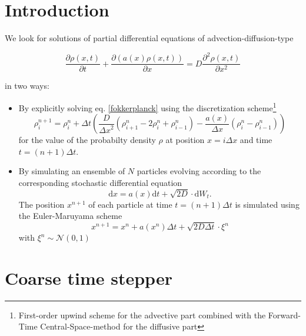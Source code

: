 \documentclass[]{article}
\title{}
\author{}
\newcommand{\pa}[2]{\frac{\partial #1}{\partial #2}}
\newcommand{\ppa}[2]{\frac{\partial^2 #1}{\partial #2^2}}
\newcommand{\dd}{\ensuremath{\mathrm{d}}}
\begin{document}
\maketitle

\begin{abstract}

\end{abstract}

\section{Introduction}

We look for solutions of partial differential equations of advection-diffusion-type

\begin{equation}
\label{fokkerplanck}
\pa{\rho(x,t)}{t} + \pa{(a(x) \rho(x,t))}{x} = D  \ppa{\rho(x,t)}{x} 
\end{equation}

in two ways:
\begin{itemize}
\item By explicitly solving eq. \eqref{fokkerplanck} using the discretization scheme\footnote{First-order upwind scheme for the advective part combined with the Forward-Time Central-Space-method for the diffusive part}
\begin{equation} 
\label{pde_discretization}
\rho_i^{n+1} = \rho_i^n + \Delta t \left( \frac{D}{{\Delta x}^2} \left( \rho_{i+1}^{n} - 2 \rho_i^n + \rho_{i-1}^n \right)  - \frac{a(x)}{\Delta x} (\rho_i^n - \rho_{i-1}^n) \right)
\end{equation}
for the value of the probabilty density $\rho$ at position $x=i \Delta x$ and time $t=(n+1) \Delta t$.
\item By simulating an ensemble of $N$ particles evolving according to the corresponding stochastic differential equation  
\begin{equation} 
\label{SDE}
    \dd x = a(x) \dd t + \sqrt{2D} \cdot \dd{W_t}.
\end{equation}
 The position $x^{n+1}$ of each  particle  at time $t= (n+1) \Delta t$ is simulated using the Euler-Maruyama scheme
\begin{equation}
   x^{n + 1} = x^{n} + a(x^n) \Delta t +  \sqrt{2D \Delta t}\cdot \xi^n \label{Euler-Mar}
\end{equation}
with $\xi^n  \sim \mathcal{N} (0,1)$
\end{itemize}

\section{Coarse time stepper}
\end{document}
